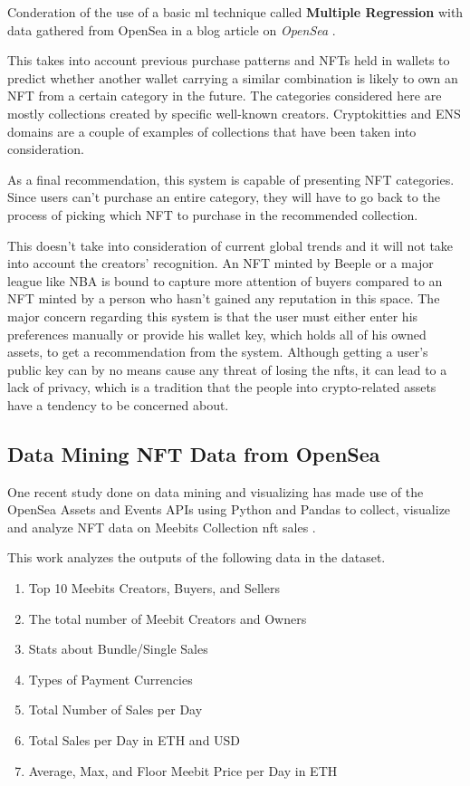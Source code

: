 \documentclass[conference]{IEEEtran}
\begin{document}
Conderation of the use of a basic \gls{ml} technique called \textbf{Multiple Regression} with data gathered from OpenSea in a blog article on \emph{OpenSea} \autocite{noauthor_what_2020}.

This takes into account previous purchase patterns and NFTs held in wallets to predict whether another wallet carrying a similar combination is likely to own an NFT from a certain category in the future. The categories considered here are mostly collections created by specific well-known creators. Cryptokitties and ENS domains are a couple of examples of collections that have been taken into consideration.

As a final recommendation, this system is capable of presenting NFT categories. Since users can't purchase an entire category, they will have to go back to the process of picking which NFT to purchase in the recommended collection.

This doesn't take into consideration of current global trends and it will not take into account the creators' recognition. An NFT minted by Beeple or a major league like NBA is bound to capture more attention of buyers compared to an NFT minted by a person who hasn't gained any reputation in this space. The major concern regarding this system is that the user must either enter his preferences manually or provide his wallet key, which holds all of his owned assets, to get a recommendation from the system. Although getting a user's public key can by no means cause any threat of losing the \gls{nft}s, it can lead to a lack of privacy, which is a tradition that the people into crypto-related assets have a tendency to be concerned about.


\subsection{Data Mining NFT Data from OpenSea}
One recent study done on data mining and visualizing has made use of the OpenSea Assets and Events APIs using Python and Pandas to collect, visualize and analyze NFT data on Meebits Collection \autocite{larva_labs_meebits_nodate} \gls{nft} sales \autocite{adil_moujahid_data_2021}.

This work analyzes the outputs of the following data in the dataset.
\begin{enumerate}
\item Top 10 Meebits Creators, Buyers, and Sellers
\item The total number of Meebit Creators and Owners
\item Stats about Bundle/Single Sales
\item Types of Payment Currencies
\item Total Number of Sales per Day
\item Total Sales per Day in ETH and USD
\item Average, Max, and Floor Meebit Price per Day in ETH
\end{enumerate}
\end{document}
